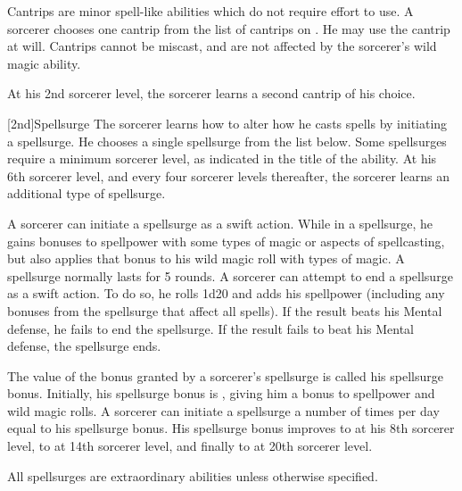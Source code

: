 Cantrips are minor spell-like abilities which do not require effort to use.
A sorcerer chooses one cantrip from the list of cantrips on .
He may use the cantrip at will.
Cantrips cannot be miscast, and are not affected by the sorcerer's wild magic ability.

At his 2nd sorcerer level, the sorcerer learns a second cantrip of his choice.

[2nd]{Spellsurge}
The sorcerer learns how to alter how he casts spells by initiating a spellsurge.
He chooses a single spellsurge from the list below.
Some spellsurges require a minimum sorcerer level, as indicated in the title of the ability.
At his 6th sorcerer level, and every four sorcerer levels thereafter, the sorcerer learns an additional type of spellsurge.

A sorcerer can initiate a spellsurge as a swift action.
While in a spellsurge, he gains bonuses to spellpower with some types of magic or aspects of spellcasting, but also applies that bonus to his wild magic roll with types of magic.
A spellsurge normally lasts for 5 rounds.
A sorcerer can attempt to end a spellsurge as a swift action.
To do so, he rolls 1d20 and adds his spellpower (including any bonuses from the spellsurge that affect all spells).
If the result beats his Mental defense, he fails to end the spellsurge.
If the result fails to beat his Mental defense, the spellsurge ends.

The value of the bonus granted by a sorcerer's spellsurge is called his spellsurge bonus.
Initially, his spellsurge bonus is , giving him a  bonus to spellpower and wild magic rolls.
A sorcerer can initiate a spellsurge a number of times per day equal to his spellsurge bonus.
His spellsurge bonus improves to  at his 8th sorcerer level, to  at 14th sorcerer level, and finally to  at 20th sorcerer level.

All spellsurges are extraordinary abilities unless otherwise specified.


